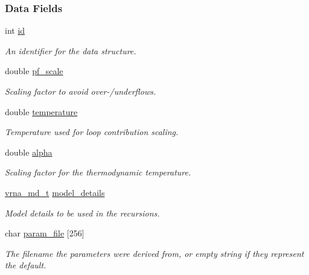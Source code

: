 \subsubsection*{Data Fields}
\begin{DoxyCompactItemize}
\item 
int \hyperlink{group__energy__parameters_a378d5bcf2bae1f3ec84c912c7d3908d2}{id}
\begin{DoxyCompactList}\small\item\em An identifier for the data structure. \end{DoxyCompactList}\item 
\mbox{\label{group__energy__parameters_a53c12f0d74f94ce371e0471a8ab5a377}} 
double \hyperlink{group__energy__parameters_a53c12f0d74f94ce371e0471a8ab5a377}{pf\+\_\+scale}
\begin{DoxyCompactList}\small\item\em Scaling factor to avoid over-\//underflows. \end{DoxyCompactList}\item 
\mbox{\label{group__energy__parameters_a674656d65ea957ddbeff8bd146b7fc16}} 
double \hyperlink{group__energy__parameters_a674656d65ea957ddbeff8bd146b7fc16}{temperature}
\begin{DoxyCompactList}\small\item\em Temperature used for loop contribution scaling. \end{DoxyCompactList}\item 
double \hyperlink{group__energy__parameters_a77145830b7bb01b36c3217b363310ef0}{alpha}
\begin{DoxyCompactList}\small\item\em Scaling factor for the thermodynamic temperature. \end{DoxyCompactList}\item 
\mbox{\label{group__energy__parameters_ac18055127bccc27c1223f1d2f3b01b53}} 
\hyperlink{group__model__details_ga1f8a10e12a0a1915f2a4eff0b28ea17c}{vrna\+\_\+md\+\_\+t} \hyperlink{group__energy__parameters_ac18055127bccc27c1223f1d2f3b01b53}{model\+\_\+details}
\begin{DoxyCompactList}\small\item\em Model details to be used in the recursions. \end{DoxyCompactList}\item 
\mbox{\label{group__energy__parameters_a8e1b02a4753a9b64c3c9ae8529b9d75c}} 
char \hyperlink{group__energy__parameters_a8e1b02a4753a9b64c3c9ae8529b9d75c}{param\+\_\+file} \mbox{[}256\mbox{]}
\begin{DoxyCompactList}\small\item\em The filename the parameters were derived from, or empty string if they represent the default. \end{DoxyCompactList}\end{DoxyCompactItemize}


